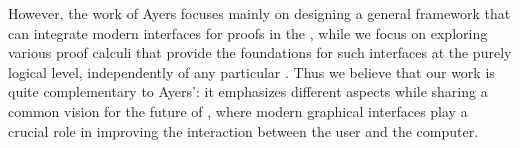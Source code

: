 However, the work of Ayers focuses mainly on designing a general framework that
can integrate modern interfaces for proofs in the  , while we focus on exploring various proof calculi that provide the
foundations for such interfaces at the purely logical level, independently of
any particular . Thus we believe that our work is quite
complementary to Ayers': it emphasizes different aspects while sharing a common
vision for the future of , where modern graphical
interfaces play a crucial role in improving the interaction between the user and
the computer.